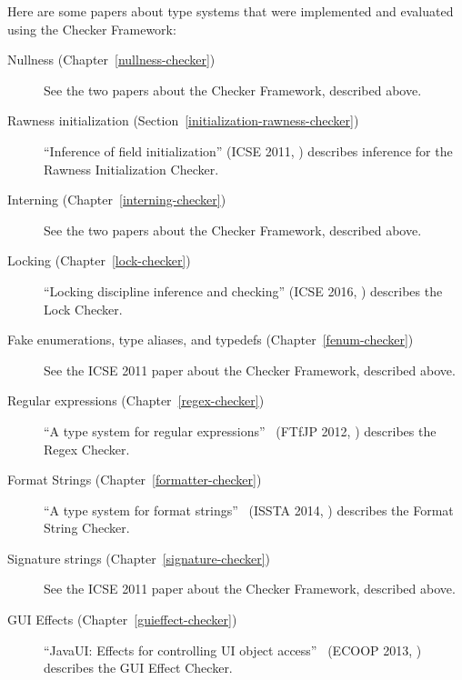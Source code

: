 Here are some papers about type systems that were implemented and evaluated
using the Checker Framework:

\begin{description}
\item[Nullness (Chapter~\ref{nullness-checker})]
See the two papers about the Checker Framework, described above.

\item[Rawness initialization (Section~\ref{initialization-rawness-checker})]
``Inference of field initialization'' (ICSE 2011, )
describes inference for the Rawness Initialization Checker.

\item[Interning (Chapter~\ref{interning-checker})]
See the two papers about the Checker Framework, described above.

\item[Locking (Chapter~\ref{lock-checker})]
``Locking discipline inference and checking'' (ICSE 2016,
)
describes the Lock Checker.

\item[Fake enumerations, type aliases, and typedefs (Chapter~\ref{fenum-checker})]
See the ICSE 2011 paper about the Checker Framework, described above.

\item[Regular expressions (Chapter~\ref{regex-checker})]
``A type system for regular expressions''~\cite{SpishakDE2012} (FTfJP 2012, )
            describes the Regex Checker.

\item[Format Strings (Chapter~\ref{formatter-checker})]
``A type system for format strings''~\cite{WeitzKSE2014} (ISSTA 2014, )
            describes the Format String Checker.

\item[Signature strings (Chapter~\ref{signature-checker})]
See the ICSE 2011 paper about the Checker Framework, described above.

\item[GUI Effects (Chapter~\ref{guieffect-checker})]
``JavaUI: Effects for controlling UI object access''~\cite{GordonDEG2013} (ECOOP 2013, )
            describes the GUI Effect Checker.


\end{description}
